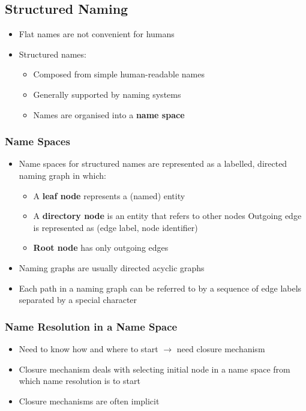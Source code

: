 \subsection{Structured Naming}
\begin{itemize}
	\item Flat names are not convenient for humans
	\item Structured names:
	\begin{itemize}
		\item Composed from simple human-readable names
		\item Generally supported by naming systems
		\item Names are organised into a \textbf{name space}
	\end{itemize}	
\end{itemize}

\subsubsection{Name Spaces}
\begin{itemize}
	\item Name spaces for structured names are represented as a labelled, directed naming graph in which:
	\begin{itemize}
		\item A \textbf{leaf node} represents a (named) entity
		\item A \textbf{directory node} is an entity that refers to other nodes
		\subitem Outgoing edge is represented as (edge label, node identifier)
		\item \textbf{Root node} has only outgoing edges
	\end{itemize}
	\item Naming graphs are usually directed acyclic graphs
	\item Each path in a naming graph can be referred to by a sequence of edge labels separated by a special character	
\end{itemize}

\subsubsection{Name Resolution in a Name Space}
\begin{itemize}
	\item Need to know how and where to start $\rightarrow$ need closure mechanism
	\item Closure mechanism deals with selecting initial node in a name space from which name resolution is to start
	\item Closure mechanisms are often implicit	
\end{itemize}

